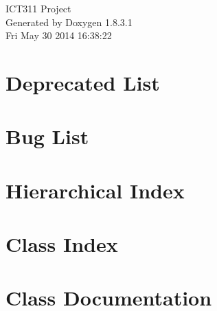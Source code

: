 \documentclass{book}
\begin{document}
\hypersetup{pageanchor=false,citecolor=blue}
\begin{titlepage}
\vspace*{7cm}
\begin{center}
{\Large I\-C\-T311 Project }\\
\vspace*{1cm}
{\large Generated by Doxygen 1.8.3.1}\\
\vspace*{0.5cm}
{\small Fri May 30 2014 16:38:22}\\
\end{center}
\end{titlepage}
\clearemptydoublepage
{}
\tableofcontents
\clearemptydoublepage
{}
\hypersetup{pageanchor=true,citecolor=blue}
\chapter{Deprecated List}
\label{deprecated}
\hypertarget{deprecated}{}

\chapter{Bug List}
\label{bug}
\hypertarget{bug}{}

\chapter{Hierarchical Index}

\chapter{Class Index}

\chapter{Class Documentation}



































\printindex
\end{document}
